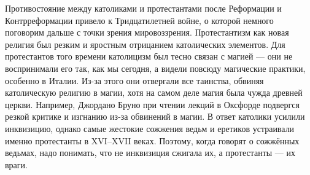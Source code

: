 Противостояние между католиками и протестантами после Реформации и Контрреформации привело к Тридцатилетней войне, о которой немного поговорим дальше с точки зрения мировоззрения. Протестантизм как новая религия был резким и яростным отрицанием католических элементов. Для протестантов того времени католицизм был тесно связан с магией --- они не воспринимали его так, как мы сегодня, а видели повсюду магические практики, особенно в Италии. Из-за этого они отвергали все таинства, обвиняя католическую религию в магии, хотя на самом деле магия была чужда древней церкви. Например, Джордано Бруно при чтении лекций в Оксфорде подвергся резкой критике и изгнанию из-за обвинений в магии. В ответ католики усилили инквизицию, однако самые жестокие сожжения ведьм и еретиков устраивали именно протестанты в XVI–XVII веках. Поэтому, когда говорят о сожжённых ведьмах, надо понимать, что не инквизиция сжигала их, а протестанты --- их враги.

